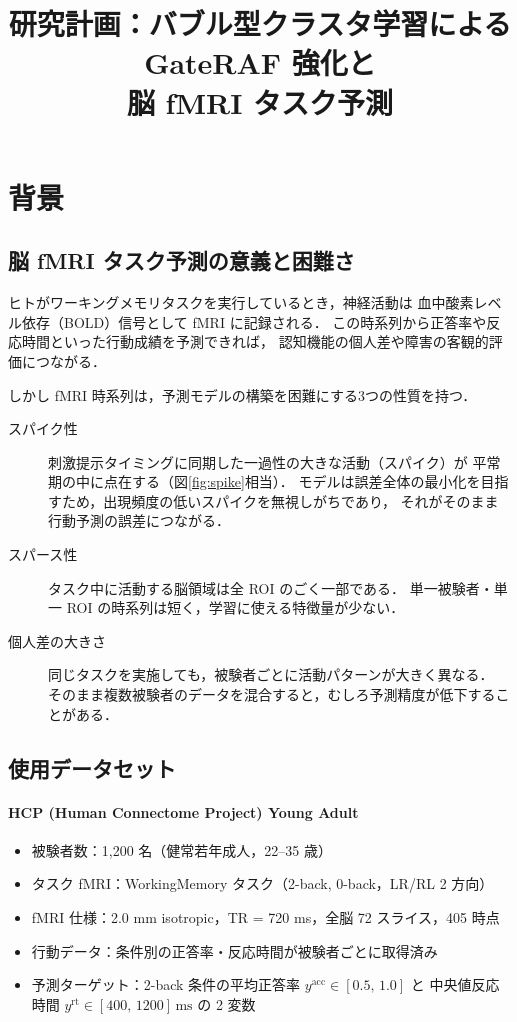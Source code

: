 \documentclass[12pt, a4paper]{ltjsarticle}
\title{研究計画：バブル型クラスタ学習による GateRAF 強化と\\
       脳 fMRI タスク予測}
\author{}
\date{}
\begin{document}
\maketitle
\tableofcontents
\newpage

\section{背景}

\subsection{脳 fMRI タスク予測の意義と困難さ}

ヒトがワーキングメモリタスクを実行しているとき，神経活動は
血中酸素レベル依存（BOLD）信号として fMRI に記録される．
この時系列から正答率や反応時間といった行動成績を予測できれば，
認知機能の個人差や障害の客観的評価につながる．

しかし fMRI 時系列は，予測モデルの構築を困難にする3つの性質を持つ．

\begin{description}
  \item[スパイク性]
    刺激提示タイミングに同期した一過性の大きな活動（スパイク）が
    平常期の中に点在する（図\ref{fig:spike}相当）．
    モデルは誤差全体の最小化を目指すため，出現頻度の低いスパイクを無視しがちであり，
    それがそのまま行動予測の誤差につながる．

  \item[スパース性]
    タスク中に活動する脳領域は全 ROI のごく一部である．
    単一被験者・単一 ROI の時系列は短く，学習に使える特徴量が少ない．

  \item[個人差の大きさ]
    同じタスクを実施しても，被験者ごとに活動パターンが大きく異なる．
    そのまま複数被験者のデータを混合すると，むしろ予測精度が低下することがある．
\end{description}

\subsection{使用データセット}

\paragraph{HCP (Human Connectome Project) Young Adult}
\begin{itemize}
  \item 被験者数：1,200 名（健常若年成人，22--35 歳）
  \item タスク fMRI：WorkingMemory タスク（2-back, 0-back，LR/RL 2 方向）
  \item fMRI 仕様：2.0 mm isotropic，TR = 720 ms，全脳 72 スライス，405 時点
  \item 行動データ：条件別の正答率・反応時間が被験者ごとに取得済み
  \item 予測ターゲット：2-back 条件の平均正答率 $y^{\text{acc}} \in [0.5,\,1.0]$ と
        中央値反応時間 $y^{\text{rt}} \in [400,\,1200]\,\text{ms}$ の 2 変数
\end{itemize}
\end{document}
